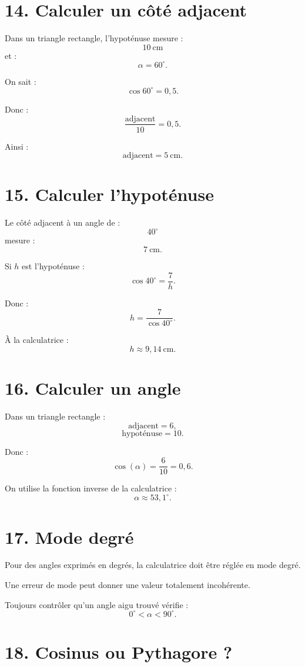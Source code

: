 \section{14. Calculer un côté adjacent}

Dans un triangle rectangle, l'hypoténuse mesure :
\[
10\ \text{cm}
\]
et :
\[
\alpha=60^\circ.
\]

On sait :
\[
\cos60^\circ=0{,}5.
\]

Donc :
\[
\dfrac{\text{adjacent}}{10}=0{,}5.
\]

Ainsi :
\[
\text{adjacent}=5\ \text{cm}.
\]

\section{15. Calculer l'hypoténuse}

Le côté adjacent à un angle de :
\[
40^\circ
\]
mesure :
\[
7\ \text{cm}.
\]

Si $h$ est l'hypoténuse :
\[
\cos40^\circ=\dfrac7h.
\]

Donc :
\[
h=\dfrac7{\cos40^\circ}.
\]

À la calculatrice :
\[
h\approx9{,}14\ \text{cm}.
\]

\section{16. Calculer un angle}

Dans un triangle rectangle :
\[
\text{adjacent}=6,
\]
\[
\text{hypoténuse}=10.
\]

Donc :
\[
\cos(\alpha)=\dfrac6{10}=0{,}6.
\]

On utilise la fonction inverse de la calculatrice :
\[
\alpha\approx53{,}1^\circ.
\]

\section{17. Mode degré}

Pour des angles exprimés en degrés, la calculatrice doit être réglée en mode degré.

Une erreur de mode peut donner une valeur totalement incohérente.

\begin{attention}
Toujours contrôler qu'un angle aigu trouvé vérifie :
\[
0^\circ<\alpha<90^\circ.
\]
\end{attention}

\section{18. Cosinus ou Pythagore ?}

